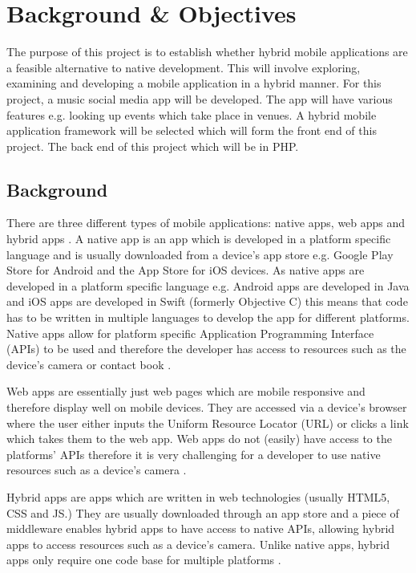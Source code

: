 \chapter{Background \& Objectives}

The purpose of this project is to establish whether hybrid mobile applications are a feasible alternative to native development. This will involve exploring, examining and developing a mobile application in a hybrid manner. For this project, a music social media app will be developed. The app will have various features e.g. looking up events which take place in  venues. A hybrid mobile application framework will be selected which will form the front end of this project. The back end of this project which will be in PHP.

\section{Background}
There are three different types of mobile applications: native apps, web apps and  hybrid apps \cite{BAB} \cite{IIA} \cite{PTA}. A native app is an app which is developed in a platform specific language and is usually downloaded from a device's app store e.g. Google Play Store for Android and the App Store for iOS devices. As  native apps are developed in a platform specific language e.g. Android apps are developed in Java \cite{AD} and iOS apps are developed in Swift (formerly Objective C) \cite{ID} this means that  code has to be written in multiple languages to develop the app for different platforms. Native apps allow for platform specific Application Programming Interface (APIs) to be used and therefore the developer has access to resources such as the device's camera or contact book \cite{MAC} \cite{MF}.

Web apps are essentially just web pages which are mobile responsive and therefore display well on mobile devices. They are accessed via a device's browser where the user either inputs the Uniform Resource Locator (URL) or clicks a link which takes them to the web app. Web apps do not (easily) have access to the platforms' APIs therefore it is very challenging for a developer to use native resources such as a device's camera \cite{MAC} \cite{BAB} .

Hybrid apps are apps which are written in web technologies (usually HTML5, CSS and JS.) They are usually downloaded through an app store and a piece of middleware enables hybrid apps to have access to native APIs, allowing hybrid apps to access resources such as a device's camera. Unlike native apps, hybrid apps only require one code base for multiple platforms\cite{MAC} \cite{SF}.

